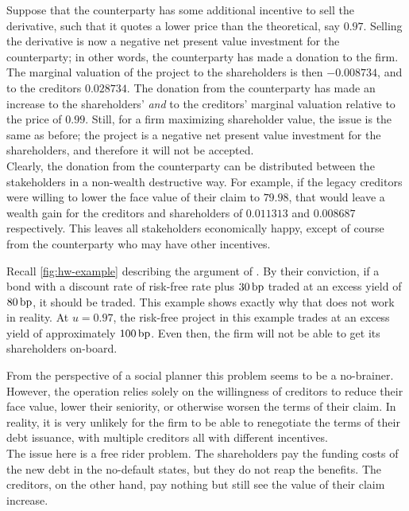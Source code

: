 \documentclass[main.tex]{subfiles}
\begin{document}
        Suppose that the counterparty has some additional incentive to sell the derivative,
        such that it quotes a lower price than the theoretical, say $\num{0.97}$.
        Selling the derivative is now a negative net present value investment for the counterparty;
        in other words, the counterparty has made a donation to the firm. 
        The marginal valuation of the project to the shareholders is then $\num{-0.008734}$,
        and to the creditors $\num{0.028734}$.
        The donation from the counterparty has made an increase to the shareholders' 
        \textit{and} to the creditors' marginal valuation relative to the price of $\num{0.99}$.
        Still, for a firm maximizing shareholder value, the issue is the same as before;
        the project is a negative net present value investment for the shareholders,
        and therefore it will not be accepted.
        \\
        Clearly, the donation from the counterparty can be distributed between the 
        stakeholders in a non-wealth destructive way. 
        For example, if the legacy creditors were willing to lower the face value of their claim
        to $\num{79.98}$, that would leave a wealth gain for the creditors and shareholders
        of $\num{0.011313}$ and $\num{0.008687}$ respectively.
        This leaves all stakeholders economically happy, 
        except of course from the counterparty who may have other incentives.

        Recall \cref{fig:hw-example} describing the argument of \textcite{HullWhite2012FVA}.
        By their conviction, if a bond with a discount rate of risk-free rate plus $30\,\text{bp}$ 
        traded at an excess yield of $80\,\text{bp}$, it should be traded. 
        This example shows exactly why that does not work in reality.
        At $u=\num{0.97}$, the risk-free project in this example trades at 
        an excess yield of approximately $100\,\text{bp}$.
        Even then, the firm will not be able to get its shareholders on-board.

        From the perspective of a social planner this problem seems to be a no-brainer. 
        However, the operation relies solely on the willingness of creditors to 
        reduce their face value, lower their seniority, or otherwise worsen the terms of their claim.
        In reality, it is very unlikely for the firm to be able to renegotiate 
        the terms of their debt issuance, with multiple creditors all with different incentives.
        \\
        The issue here is a free rider problem. 
        The shareholders pay the funding costs of the new debt in the no-default states,
        but they do not reap the benefits.
        The creditors, on the other hand, pay nothing 
        but still see the value of their claim increase.
\end{document}
